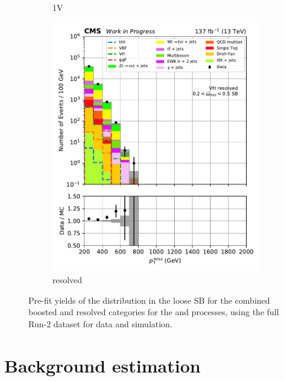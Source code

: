 \begin{figure}[htbp]
\begin{subfigure}[b]{0.24\textwidth}
        \caption{\VH 1V}
    \end{subfigure}
    \hfill
    \begin{subfigure}[b]{0.24\textwidth}
        \includegraphics[width=\textwidth]{figures/region_plots/2016to18/sideband_4/VH_resolved.pdf}
        \caption{\VH resolved}
    \end{subfigure}
    \caption[Pre-fit yields of the \ptmiss distribution in the loose \omegaTilde sideband for the combined boosted and resolved categories for the \ttH and \VH processes, using the full Run-2 dataset for data and simulation]{Pre-fit yields of the \ptmiss distribution in the loose \omegaTilde \gls{SB} for the combined boosted and resolved categories for the \ttH and \VH processes, using the full Run-2 dataset for data and simulation.}
    \label{fig:htoinv_sb_yields_comb2016to18_loose_minOmegaTilde}
\end{figure}





\section{Background estimation}
\label{sec:htoinv_background_est}

